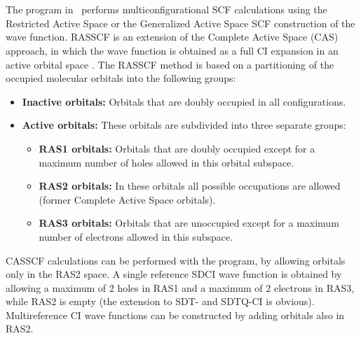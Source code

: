 
\section{}
\label{UG:sec:rasscf}

The  program in \molcas\ performs
multiconfigurational SCF calculations using the Restricted Active
Space \cite{raspek} or the Generalized Active Space \cite{gas2011} SCF construction of the wave function.
RASSCF is an extension of the Complete Active Space
(CAS) approach, in which the wave function is obtained as a full CI
expansion in an active orbital space \cite{caspek1,Roos:87}.
The RASSCF method is based on a partitioning of the occupied molecular
orbitals into the following groups:
\begin{itemize}
\itemsep 9pt plus 3pt minus 3pt
\item
{\bf Inactive orbitals:} Orbitals that are doubly occupied in all
configurations.
\item
{\bf Active orbitals:} These orbitals are subdivided into three separate
groups:
\begin{itemize}
\itemsep 9pt plus 3pt minus 3pt
\item {\bf RAS1 orbitals:} Orbitals that are doubly occupied except for
a maximum number of holes allowed in this orbital subspace.
\item {\bf RAS2 orbitals:} In these orbitals all possible occupations are
allowed (former Complete Active Space orbitals).
\item
{\bf RAS3 orbitals:} Orbitals that are unoccupied except for
a maximum number of electrons allowed in this subspace.
\end{itemize}
\end{itemize}

CASSCF calculations can be performed with the program, by allowing
orbitals only in the RAS2 space. A single reference SDCI wave function
is obtained by allowing a maximum of 2 holes in RAS1 and a maximum of
2 electrons in RAS3, while RAS2 is empty (the extension to SDT- and SDTQ-CI is
obvious). Multireference CI wave
functions can be constructed by adding orbitals also in RAS2.

